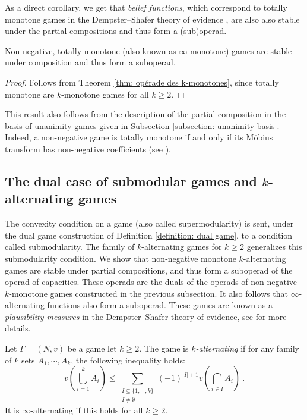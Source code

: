 \documentclass[a4paper,12pt]{amsart}
\begin{document}
As a direct corollary, we get that \textit{belief functions}, which correspond to totally monotone games in the Dempster--Shafer theory of evidence \cite{dempster1967upper, shafer1976mathematical, kohlas2013mathematical}, are also also stable under the partial compositions and thus form a (sub)operad. 

\begin{corollary}\label{cor: totally monotone}
Non-negative, totally monotone (also known as $\infty$-monotone) games are stable under composition and thus form a suboperad.
\end{corollary}

\begin{proof}
Follows from Theorem \ref{thm: opérade des k-monotones}, since totally monotone are $k$-monotone games for all $k \geq 2$.
\end{proof}

\begin{remark}
This result also follows from the description of the partial composition in the basis of unanimity games given in Subsection \ref{subsection: unanimity basis}. Indeed, a non-negative game is totally monotone if and only if its Möbius transform has non-negative coefficients (see \cite[Equation~(2.1)]{shafer1976mathematical}). 
\end{remark}

\subsection{The dual case of submodular games and $k$-alternating games} The convexity condition on a game (also called supermodularity) is sent, under the dual game construction of Definition \ref{definition: dual game}, to a condition called submodularity. The family of $k$-alternating games for $k \geq 2$ generalizes this submodularity condition. We show that non-negative monotone $k$-alternating games are stable under partial compositions, and thus form a suboperad of the operad of capacities. These operads are the duals of the operads of non-negative $k$-monotone games constructed in the previous subsection. It also follows that $\infty$-alternating functions also form a suboperad. These games are known as a \textit{plausibility measures} in the Dempster--Shafer theory of evidence, see \cite{shafer1976mathematical, Hohle87} for more details. 

\begin{definition}
Let $\Gamma = (N,v)$ be a game let $k \geq 2$. The game is $k$\textit{-alternating} if for any family of $k$ sets $A_1, \cdots, A_k$, the following inequality holds: 
\[
v\left(\bigcup_{i=1}^k A_i \right) \leq \sum_{\substack{I \subseteq \{1,\cdots,k\}\\ I \neq \emptyset}} (-1)^{|I|+1} v\left(\bigcap_{i\in I} A_i\right)~. 
\]
It is $\infty$-alternating if this holds for all $k \geq 2$. 
\end{definition}
\end{document}
